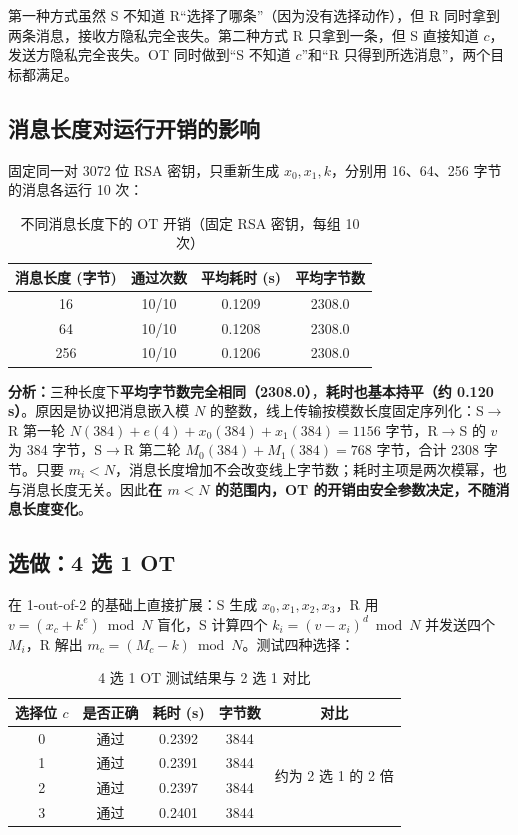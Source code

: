 \documentclass{SYSUReport}
\begin{document}
第一种方式虽然 S 不知道 R“选择了哪条”（因为没有选择动作），但 R 同时拿到两条消息，接收方隐私完全丧失。第二种方式 R 只拿到一条，但 S 直接知道 $c$，发送方隐私完全丧失。OT 同时做到“S 不知道 $c$”和“R 只得到所选消息”，两个目标都满足。

\subsection{消息长度对运行开销的影响}

固定同一对 3072 位 RSA 密钥，只重新生成 $x_0,x_1,k$，分别用 16、64、256 字节的消息各运行 10 次：

\begin{table}[h]
\centering
\caption{不同消息长度下的 OT 开销（固定 RSA 密钥，每组 10 次）}
\begin{tabular}{cccc}
\toprule
消息长度 (字节) & 通过次数 & 平均耗时 (s) & 平均字节数 \\
\midrule
16  & 10/10 & 0.1209 & 2308.0 \\
64  & 10/10 & 0.1208 & 2308.0 \\
256 & 10/10 & 0.1206 & 2308.0 \\
\bottomrule
\end{tabular}
\end{table}

\textbf{分析：}三种长度下\textbf{平均字节数完全相同（2308.0）}，\textbf{耗时也基本持平（约 0.120 s）}。原因是协议把消息嵌入模 $N$ 的整数，线上传输按模数长度固定序列化：S$\to$R 第一轮 $N(384)+e(4)+x_0(384)+x_1(384)=1156$ 字节，R$\to$S 的 $v$ 为 384 字节，S$\to$R 第二轮 $M_0(384)+M_1(384)=768$ 字节，合计 2308 字节。只要 $m_i<N$，消息长度增加不会改变线上字节数；耗时主项是两次模幂，也与消息长度无关。因此\textbf{在 $m<N$ 的范围内，OT 的开销由安全参数决定，不随消息长度变化}。

\subsection{选做：4 选 1 OT}
\label{sec:ot41}

在 1-out-of-2 的基础上直接扩展：S 生成 $x_0,x_1,x_2,x_3$，R 用 $v=(x_c+k^e)\bmod N$ 盲化，S 计算四个 $k_i=(v-x_i)^d\bmod N$ 并发送四个 $M_i$，R 解出 $m_c=(M_c-k)\bmod N$。测试四种选择：

\begin{table}[h]
\centering
\caption{4 选 1 OT 测试结果与 2 选 1 对比}
\begin{tabular}{ccccc}
\toprule
选择位 $c$ & 是否正确 & 耗时 (s) & 字节数 & 对比 \\
\midrule
0 & 通过 & 0.2392 & 3844 & \multirow{4}{*}{约为 2 选 1 的 2 倍} \\
1 & 通过 & 0.2391 & 3844 & \\
2 & 通过 & 0.2397 & 3844 & \\
3 & 通过 & 0.2401 & 3844 & \\
\bottomrule
\end{tabular}
\end{table}
\end{document}

